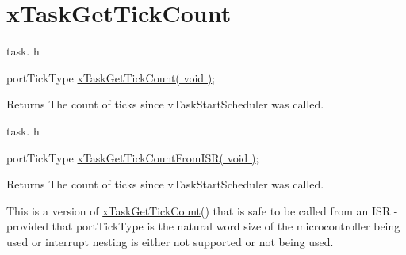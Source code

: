 \hypertarget{group__xTaskGetTickCount}{}\section{x\+Task\+Get\+Tick\+Count}
\label{group__xTaskGetTickCount}
task. h 
\begin{DoxyPre}portTickType \hyperlink{task_8h_a25ba1c4490c7e3ae11bc1e25192b12dc}{xTaskGetTickCount( void )};\end{DoxyPre}


\begin{DoxyReturn}{Returns}
The count of ticks since v\+Task\+Start\+Scheduler was called.
\end{DoxyReturn}
task. h 
\begin{DoxyPre}portTickType \hyperlink{task_8h_a9b3e0b8c2ce6d35ec82b1551139a95a4}{xTaskGetTickCountFromISR( void )};\end{DoxyPre}


\begin{DoxyReturn}{Returns}
The count of ticks since v\+Task\+Start\+Scheduler was called.
\end{DoxyReturn}
This is a version of \hyperlink{task_8h_a25ba1c4490c7e3ae11bc1e25192b12dc}{x\+Task\+Get\+Tick\+Count()} that is safe to be called from an I\+SR -\/ provided that port\+Tick\+Type is the natural word size of the microcontroller being used or interrupt nesting is either not supported or not being used. 